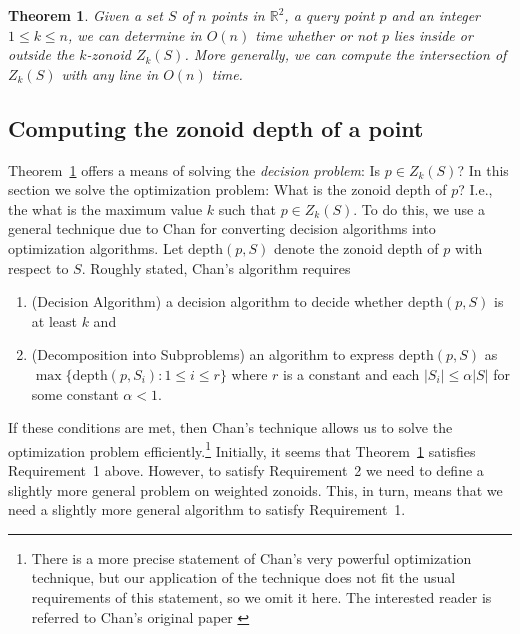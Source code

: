 \documentclass{elsart}
\newtheorem{theorem}{Theorem}
\newcommand{\depth}{\mathrm{depth}}
\begin{document}
\begin{theorem}\label{theorem_decision_problem}
Given a set $S$ of $n$ points in $\mathbb{R}^2$, a query point $p$ and
an integer $1 \le k \le n$, we can determine in $O(n)$ time whether or not $p$ lies inside or outside the $k$-zonoid $Z_k(S)$. More generally, we can compute the intersection of $Z_k(S)$ with any line in $O(n)$ time.
\end{theorem}

\subsection{Computing the zonoid depth of a point}
\label{subsection_computing_the_zonoid_depth_of_a_point}

Theorem~\ref{theorem_decision_problem} offers a means of solving the
\emph{decision problem}: Is $p\in Z_k(S)$?  In this section we solve
the optimization problem:  What is the zonoid depth of $p$? I.e., the
what is the maximum value $k$ such that $p\in Z_k(S)$.  To do this, we
use a general technique due to Chan
\cite{geometric_applications_of_a_randomized_optimization_technique}
for converting decision algorithms into optimization algorithms.  Let
$\depth(p,S)$ denote the zonoid depth of $p$ with respect to $S$.
Roughly stated, Chan's algorithm requires
\begin{enumerate}

\item (Decision Algorithm) a decision algorithm to decide whether
$\depth(p,S)$ is at least $k$ and

\item (Decomposition into Subproblems) an algorithm to express
$\depth(p,S)$ as $\max\{\depth(p,S_i):1\le i\le r\}$ where $r$ is a
constant and each $|S_i|\le \alpha|S|$ for some constant $\alpha < 1$.
\end{enumerate}

If these conditions are met, then Chan's technique
allows us to solve the optimization problem
efficiently.\footnote{There is a more precise statement of Chan's very
powerful optimization technique, but our application of the technique
does not fit the usual requirements of this statement, so we omit it
here.  The interested reader is referred to Chan's original paper
\cite{geometric_applications_of_a_randomized_optimization_technique}}
Initially, it seems that Theorem~\ref{theorem_decision_problem}
satisfies Requirement~1 above.  However, to satisfy Requirement~2 we
need to define a slightly more general problem on weighted zonoids.
This, in turn, means that we need a slightly more general algorithm to
satisfy Requirement~1.
\end{document}
